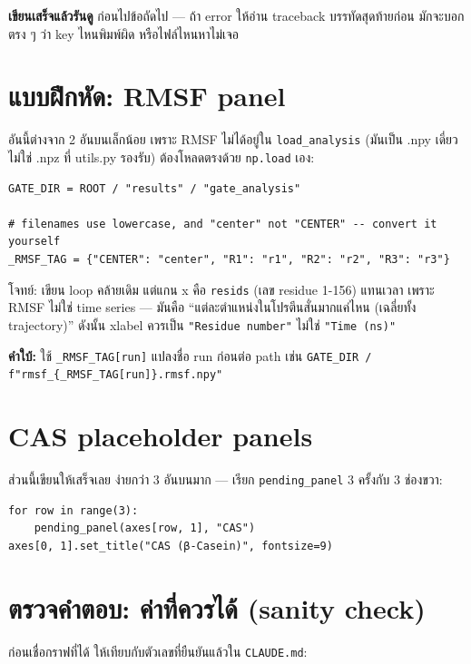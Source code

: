 \documentclass[11pt,a4paper]{article}
\begin{document}
\textbf{เขียนเสร็จแล้วรันดู} ก่อนไปข้อถัดไป — ถ้า error ให้อ่าน traceback บรรทัดสุดท้ายก่อน
มักจะบอกตรง ๆ ว่า key ไหนพิมพ์ผิด หรือไฟล์ไหนหาไม่เจอ

\section{แบบฝึกหัด: RMSF panel}
อันนี้ต่างจาก 2 อันบนเล็กน้อย เพราะ RMSF ไม่ได้อยู่ใน \texttt{load\_analysis} (มันเป็น .npy
เดี่ยว ไม่ใช่ .npz ที่ utils.py รองรับ) ต้องโหลดตรงด้วย \texttt{np.load} เอง:

\begin{lstlisting}
GATE_DIR = ROOT / "results" / "gate_analysis"

# filenames use lowercase, and "center" not "CENTER" -- convert it yourself
_RMSF_TAG = {"CENTER": "center", "R1": "r1", "R2": "r2", "R3": "r3"}
\end{lstlisting}

โจทย์: เขียน loop คล้ายเดิม แต่แกน x คือ \texttt{resids} (เลข residue 1-156) แทนเวลา
เพราะ RMSF ไม่ใช่ time series — มันคือ ``แต่ละตำแหน่งในโปรตีนสั่นมากแค่ไหน (เฉลี่ยทั้ง
trajectory)'' ดังนั้น xlabel ควรเป็น \texttt{"Residue number"} ไม่ใช่ \texttt{"Time (ns)"}

\textbf{คำใบ้:} ใช้ \texttt{\_RMSF\_TAG[run]} แปลงชื่อ run ก่อนต่อ path เช่น
\texttt{GATE\_DIR / f"rmsf\_\{\_RMSF\_TAG[run]\}.rmsf.npy"}

\section{CAS placeholder panels}
ส่วนนี้เขียนให้เสร็จเลย ง่ายกว่า 3 อันบนมาก — เรียก \texttt{pending\_panel} 3 ครั้งกับ 3 ช่องขวา:

\begin{lstlisting}
for row in range(3):
    pending_panel(axes[row, 1], "CAS")
axes[0, 1].set_title("CAS (β-Casein)", fontsize=9)
\end{lstlisting}

\section{ตรวจคำตอบ: ค่าที่ควรได้ (sanity check)}
\label{sec:sanity}
ก่อนเชื่อกราฟที่ได้ ให้เทียบกับตัวเลขที่ยืนยันแล้วใน \texttt{CLAUDE.md}:
\end{document}

